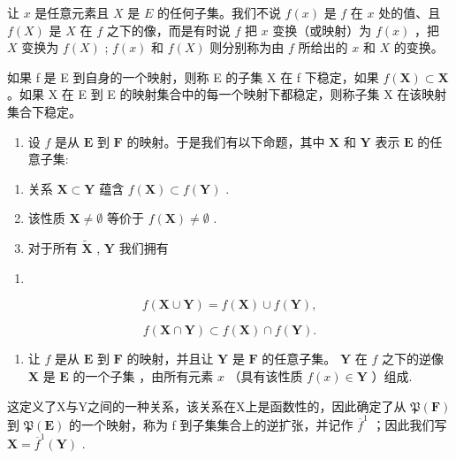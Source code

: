 让 \(x\) 是任意元素且 \(X\) 是 \(E\) 的任何子集。我们不说 \(f(x)\) 是 \(f\) 在 \(x\) 处的值、且 \(f(X)\) 是 \(X\) 在 \(f\) 之下的像，而是有时说 \(f\) 把 \(x\) 变换（或映射）为 \(f(x)\) ，把 \(X\) 变换为 \(f(X)\) ; \(f(x)\) 和 \(f(X)\) 则分别称为由 \(f\) 所给出的 \(x\) 和 \(X\) 的变换。

如果 f 是 E 到自身的一个映射，则称 E 的子集 X 在 f 下稳定，如果 \(f(\mathbf{X}) \subset \mathbf{X}\) 。如果 X 在 E 到 E 的映射集合中的每一个映射下都稳定，则称子集 X 在该映射集合下稳定。

\begin{enumerate}
\def\labelenumi{\arabic{enumi}.}
\setcounter{enumi}{4}
\tightlist
\item
  设 \(f\) 是从 \(\mathbf{E}\) 到 \(\mathbf{F}\) 的映射。于是我们有以下命题，其中 \(\mathbf{X}\) 和 \(\mathbf{Y}\) 表示 \(\mathbf{E}\) 的任意子集:
\end{enumerate}

\begin{enumerate}
\def\labelenumi{(\alph{enumi})}
\item
  关系 \(\mathbf{X} \subset \mathbf{Y}\) 蕴含 \(f(\mathbf{X}) \subset f(\mathbf{Y})\) .
\item
  该性质 \(\mathbf{X} \neq \emptyset\) 等价于 \(f(\mathbf{X}) \neq \emptyset\) .
\item
  对于所有 \(\tilde{\mathbf{X}}\) , \(\mathbf{Y}\) 我们拥有
\end{enumerate}

\begin{enumerate}
\def\labelenumi{(\arabic{enumi})}
\setcounter{enumi}{10}
\tightlist
\item
\end{enumerate}

\[
f (\mathbf {X} \cup \mathbf {Y}) = f (\mathbf {X}) \cup f (\mathbf {Y}),\tag{12}
\]

\[
f (\mathbf {X} \cap \mathbf {Y}) \subset f (\mathbf {X}) \cap f (\mathbf {Y}).
\]

\begin{enumerate}
\def\labelenumi{\arabic{enumi}.}
\setcounter{enumi}{5}
\tightlist
\item
  让 \(f\) 是从 \(\mathbf{E}\) 到 \(\mathbf{F}\) 的映射，并且让 \(\mathbf{Y}\) 是 \(\mathbf{F}\) 的任意子集。 \(\mathbf{Y}\) 在 \(f\) 之下的逆像 \(\mathbf{X}\) 是 \(\mathbf{E}\) 的一个子集 ，由所有元素 \(x\) （具有该性质 \(f(x) \in \mathbf{Y}\) ）组成.
\end{enumerate}

这定义了X与Y之间的一种关系，该关系在X上是函数性的，因此确定了从 \(\mathfrak{P}(\mathbf{F})\) 到 \(\mathfrak{P}(\mathbf{E})\) 的一个映射，称为 f 到子集集合上的逆扩张，并记作 \(\overline{f}^{1}\) ；因此我们写 \(\mathbf{X} = \overline{f}^{1}(\mathbf{Y})\) .

